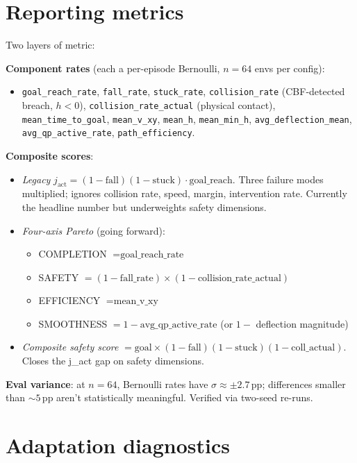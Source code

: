\documentclass[11pt]{article}
\begin{document}
\section*{Reporting metrics}

Two layers of metric:

\textbf{Component rates} (each a per-episode Bernoulli, $n=64$ envs per config):
\begin{itemize}
\item \texttt{goal\_reach\_rate}, \texttt{fall\_rate}, \texttt{stuck\_rate}, \texttt{collision\_rate} (CBF-detected breach, $h{<}0$), \texttt{collision\_rate\_actual} (physical contact), \texttt{mean\_time\_to\_goal}, \texttt{mean\_v\_xy}, \texttt{mean\_h}, \texttt{mean\_min\_h}, \texttt{avg\_deflection\_mean}, \texttt{avg\_qp\_active\_rate}, \texttt{path\_efficiency}.
\end{itemize}

\textbf{Composite scores}:
\begin{itemize}
\item \emph{Legacy} $j_\text{act} = (1-\text{fall})(1-\text{stuck}) \cdot \text{goal\_reach}$. Three failure modes multiplied; ignores collision rate, speed, margin, intervention rate. Currently the headline number but underweights safety dimensions.
\item \emph{Four-axis Pareto} (going forward):
\begin{itemize}
\item COMPLETION $= \text{goal\_reach\_rate}$
\item SAFETY $= (1-\text{fall\_rate}) \times (1-\text{collision\_rate\_actual})$
\item EFFICIENCY $= \text{mean\_v\_xy}$
\item SMOOTHNESS $= 1 - \text{avg\_qp\_active\_rate}$ (or $1 - $ deflection magnitude)
\end{itemize}
\item \emph{Composite safety score} $= \text{goal} \times (1-\text{fall})(1-\text{stuck})(1-\text{coll\_actual})$. Closes the j\_act gap on safety dimensions.
\end{itemize}

\textbf{Eval variance}: at $n=64$, Bernoulli rates have $\sigma \approx \pm 2.7$\,pp; differences smaller than $\sim 5$\,pp aren't statistically meaningful. Verified via two-seed re-runs.

\section*{Adaptation diagnostics}
\end{document}
